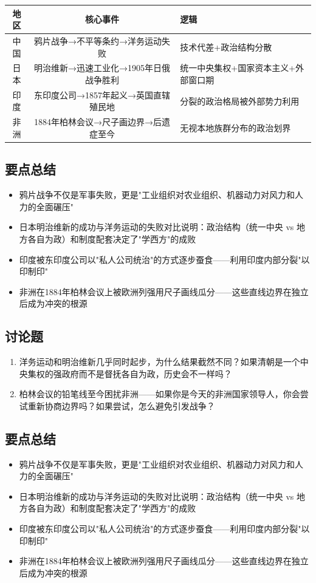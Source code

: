 \documentclass[a4paper,12pt]{ctexart}
\begin{document}
\begin{center}
\begin{tabular}{|c|c|p{7cm}|}
\hline
\textbf{地区} & \textbf{核心事件} & \textbf{逻辑} \\
\hline
中国 & 鸦片战争→不平等条约→洋务运动失败 & 技术代差+政治结构分散 \\
\hline
日本 & 明治维新→迅速工业化→1905年日俄战争胜利 & 统一中央集权+国家资本主义+外部窗口期 \\
\hline
印度 & 东印度公司→1857年起义→英国直辖殖民地 & 分裂的政治格局被外部势力利用 \\
\hline
非洲 & 1884年柏林会议→尺子画边界→后遗症至今 & 无视本地族群分布的政治划界 \\
\hline
\end{tabular}
\end{center}

\subsection*{要点总结}
\begin{itemize}
  \item 鸦片战争不仅是军事失败，更是"工业组织对农业组织、机器动力对风力和人力的全面碾压"
  \item 日本明治维新的成功与洋务运动的失败对比说明：政治结构（统一中央 vs 地方各自为政）和制度配套决定了"学西方"的成败
  \item 印度被东印度公司以"私人公司统治"的方式逐步蚕食——利用印度内部分裂"以印制印"
  \item 非洲在1884年柏林会议上被欧洲列强用尺子画线瓜分——这些直线边界在独立后成为冲突的根源
\end{itemize}

\subsection*{讨论题}
\begin{enumerate}
  \item 洋务运动和明治维新几乎同时起步，为什么结果截然不同？如果清朝是一个中央集权的强政府而不是督抚各自为政，历史会不一样吗？
  \item 柏林会议的铅笔线至今困扰非洲——如果你是今天的非洲国家领导人，你会尝试重新协商边界吗？如果尝试，怎么避免引发战争？
\end{enumerate}

\subsection*{要点总结}
\begin{itemize}
  \item 鸦片战争不仅是军事失败，更是"工业组织对农业组织、机器动力对风力和人力的全面碾压"
  \item 日本明治维新的成功与洋务运动的失败对比说明：政治结构（统一中央 vs 地方各自为政）和制度配套决定了"学西方"的成败
  \item 印度被东印度公司以"私人公司统治"的方式逐步蚕食——利用印度内部分裂"以印制印"
  \item 非洲在1884年柏林会议上被欧洲列强用尺子画线瓜分——这些直线边界在独立后成为冲突的根源
\end{itemize}
\end{document}
